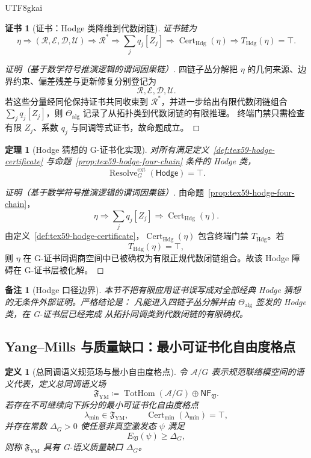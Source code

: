 \documentclass[12pt]{article}
\newtheorem{definition}{定义}[section]
\newtheorem{theorem}{定理}[section]
\newtheorem{remark}{备注}[section]
\newtheorem{Certificate}{证书}[section]
\newcommand{\Vsys}{\mathfrak V}
\newcommand{\NF}{\mathsf{NF}}
\newcommand{\DefEq}{\coloneqq}
\newcommand{\Rstar}{\mathcal{R}^{\ast}}
\newcommand{\Rcal}{\mathcal{R}}
\newcommand{\Ecal}{\mathcal{E}}
\newcommand{\Dcal}{\mathcal{D}}
\newcommand{\Ucal}{\mathcal{U}}
\DeclareMathOperator{\Cert}{Cert}
\DeclareMathOperator{\Resolve}{Resolve}
\DeclareMathOperator{\TotHom}{TotHom}
\begin{document}
\begin{CJK*}{UTF8}{gkai}
\begin{Certificate}[证书：Hodge 类降维到代数闭链]
\label{cert:tex59-hodge-four-chain}
证书链为
\[
  \eta
  \Longrightarrow
  (\Rcal,\Ecal,\Dcal,\Ucal)
  \Longrightarrow
  \Rstar
  \Longrightarrow
  \sum_j q_j[Z_j]
  \Longrightarrow
  \Cert_{\mathrm{Hdg}}(\eta)
  \Longrightarrow
  T_{\mathrm{Hdg}}(\eta)=\top.
\]
\end{Certificate}

\begin{proof}[证明（基于数学符号推演逻辑的谓词因果链）]
四链子丛分解把 \(\eta\) 的几何来源、边界约束、偏差残差与更新修复分别登记为
\[
  \Rcal,\Ecal,\Dcal,\Ucal.
\]
若这些分量经同伦保持证书共同收束到 \(\Rstar\)，并进一步给出有限代数闭链组合
\(\sum_j q_j[Z_j]\)，则 \(\Theta_{\mathrm{alg}}\) 记录了从拓扑类到代数闭链的有限推理。
终端门禁只需检查有限 \(Z_j\)、系数 \(q_j\) 与同调等式证书，故命题成立。
\end{proof}

\begin{theorem}[Hodge 猜想的 G-证书化实现]
\label{thm:tex59-hodge-resolution}
对所有满足定义~\ref{def:tex59-hodge-certificate} 与命题~\ref{prop:tex59-hodge-four-chain}
条件的 Hodge 类，
\[
  \Resolve_G^{\mathrm{ext}}(\mathsf{Hodge})=\top.
\]
\end{theorem}

\begin{proof}[证明（基于数学符号推演逻辑的谓词因果链）]
由命题~\ref{prop:tex59-hodge-four-chain}，
\[
  \eta
  \Longrightarrow
  \sum_jq_j[Z_j]
  \Longrightarrow
  \Cert_{\mathrm{Hdg}}(\eta).
\]
由定义~\ref{def:tex59-hodge-certificate}，\(\Cert_{\mathrm{Hdg}}(\eta)\) 包含终端门禁
\(T_{\mathrm{Hdg}}\)。若
\[
  T_{\mathrm{Hdg}}(\eta)=\top,
\]
则 \(\eta\) 在 G-证书同调商空间中已被确权为有限正规代数闭链组合。故该 Hodge 障碍在
G-证书层被化解。
\end{proof}

\begin{remark}[Hodge 口径边界]
本节不把有限应用证书误写成对全部经典 Hodge 猜想的无条件外部证明。严格结论是：
凡能进入四链子丛分解并由 \(\Theta_{\mathrm{alg}}\) 签发的 Hodge 类，在 G-证书层已经完成
从拓扑同调类到代数闭链的有限确权。
\end{remark}

\subsection{Yang--Mills 与质量缺口：最小可证书化自由度格点}
\label{subsec:tex59-yang-mills}

\begin{definition}[总同调语义规范场与最小自由度格点]
\label{def:tex59-ym-min-grid}
令 \(\mathcal A/G\) 表示规范联络模空间的语义代表，定义总同调语义场
\[
  \mathfrak F_{\mathrm{YM}}
  \DefEq
  \TotHom(\mathcal A/G)\oplus \NF_{\Vsys}.
\]
若存在不可继续向下拆分的最小可证书化自由度格点
\[
  \lambda_{\min}\in\mathfrak F_{\mathrm{YM}},
  \qquad
  \Cert_{\min}(\lambda_{\min})=\top,
\]
并存在常数 \(\Delta_G>0\) 使任意非真空激发态 \(\psi\) 满足
\[
  E_{\Vsys}(\psi)\ge \Delta_G,
\]
则称 \(\mathfrak F_{\mathrm{YM}}\) 具有 G-语义质量缺口 \(\Delta_G\)。
\end{definition}


\end{CJK*}
\end{document}
